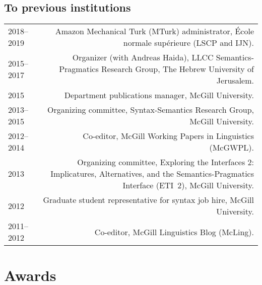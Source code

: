 \documentclass[12pt,letterpaper,twoside]{article}
\makeatletter
\newenvironment{cvsection}{%
  \begin{longtable}[l]{@{}L@{} @{}R@{}}
}{%
  \end{longtable}
}
\makeatother
\begin{document}
\subsection*{To previous institutions}

\begin{cvsection}
  2018--2019 & Amazon Mechanical Turk (MTurk) administrator, École normale supérieure (LSCP and IJN).\\
  2015--2017 & Organizer (with Andreas Haida), LLCC Semantics-Pragmatics Research Group, The Hebrew University of Jerusalem.\\
  2015 & Department publications manager, McGill University.\\
  2013--2015 & Organizing committee, Syntax-Semantics Research Group, McGill University.\\
  2012--2014 & Co-editor, McGill Working Papers in Linguistics (McGWPL).\\
  2013 & Organizing committee, Exploring the Interfaces 2: Implicatures, Alternatives, and the Semantics-Pragmatics Interface (ETI~2), McGill University.\\
  2012 & Graduate student representative for syntax job hire, McGill University.\\
  2011--2012 & Co-editor, McGill Linguistics Blog (McLing).\\
\end{cvsection}

\section*{Awards}
\end{document}
